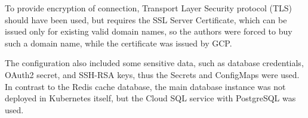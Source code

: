 To provide encryption of connection, Transport Layer Security protocol (TLS) should have been used, but requires the SSL Server Certificate, which can be issued only for existing valid domain names, so the authors were forced to buy such a domain name, while the certificate was issued by GCP.

The configuration also included some sensitive data, such as database credentials, OAuth2 secret, and SSH-RSA keys, thus the Secrets and ConfigMaps were used.
In contrast to the Redis cache database, the main database instance was not deployed in Kubernetes itself, but the Cloud SQL service with \mbox{PostgreSQL} was used.
